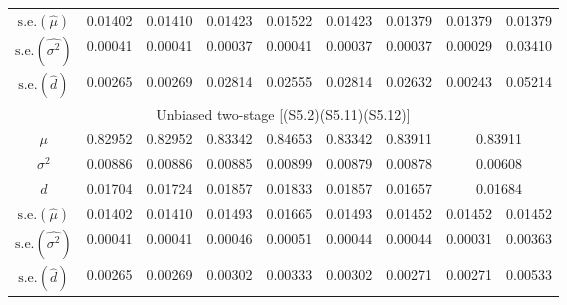 \documentclass[11pt,a5paper,twoside]{book}
\begin{document}
\begin{table}[!t]
\begin{center}
{\begin{tabular}{ccccccccc}
\hline
$\mbox{s.e.}(\widehat{\mu})$ & 0.01402 & 0.01410 & 0.01423 & 0.01522 & 0.01423 & 0.01379 & 0.01379 & 0.01379 \\
$\mbox{s.e.}(\widehat{\sigma^2})$ & 0.00041 & 0.00041 & 0.00037 & 0.00041 & 0.00037 & 0.00037 & 0.00029 & 0.03410 \\
  $\mbox{s.e.}(\widehat{d})$ & 0.00265 & 0.00269 & 0.02814 & 0.02555 & 0.02814 & 0.02632 & 0.00243 & 0.05214 \\


\hline\hline
\multicolumn{9}{c}{{Unbiased two-stage [(S5.2)(S5.11)(S5.12)]}}\\
\hline
$\mu$  & 0.82952 & 0.82952 & 0.83342 & 0.84653 & 0.83342 & 0.83911 & \multicolumn{2}{c}{0.83911}  \\
$\sigma^2$ & 0.00886 & 0.00886 & 0.00885 & 0.00899 & 0.00879 & 0.00878 & \multicolumn{2}{c}{0.00608}  \\
$d$ & 0.01704 & 0.01724 & 0.01857 & 0.01833 & 0.01857 & 0.01657 & \multicolumn{2}{c}{0.01684}  \\

\hline
$\mbox{s.e.}(\widehat{\mu})$ & 0.01402 & 0.01410 & 0.01493 & 0.01665 & 0.01493 & 0.01452 & 0.01452 & 0.01452 \\
$\mbox{s.e.}(\widehat{\sigma^2})$ & 0.00041 & 0.00041 & 0.00046 & 0.00051 & 0.00044 & 0.00044 & 0.00031 & 0.00363 \\
  $\mbox{s.e.}(\widehat{d})$ & 0.00265 & 0.00269 & 0.00302 & 0.00333 & 0.00302 & 0.00271 & 0.00271 & 0.00533 \\


\hline\hline
\end{tabular}}
\end{center}
\end{table}



\end{document}

